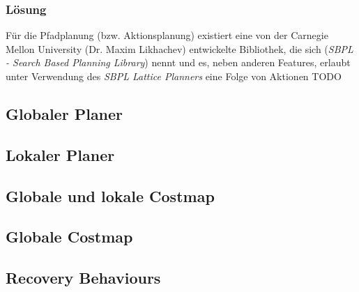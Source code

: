 \documentclass[oribibl]{llncs}
\begin{document}
\subsubsection{Lösung}
Für die Pfadplanung (bzw. Aktionsplanung) existiert eine von der Carnegie Mellon University (Dr. Maxim Likhachev\cite{likhachev}) entwickelte Bibliothek, die sich (\textit{SBPL - Search Based Planning Library})\cite{sbplMain} nennt und es, neben anderen Features, erlaubt unter Verwendung des \textit{SBPL Lattice Planners} eine Folge von Aktionen TODO
\subsection{Globaler Planer}
\subsection{Lokaler Planer}
\subsection{Globale und lokale Costmap}
\subsection{Globale Costmap}
\subsection{Recovery Behaviours}



\end{document}
